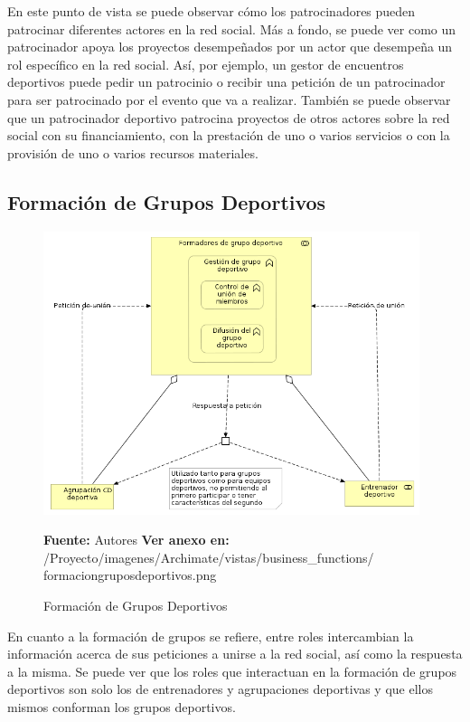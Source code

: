 En este punto de vista se puede observar cómo los patrocinadores pueden patrocinar diferentes actores en la red social. Más a fondo, se puede ver como un patrocinador apoya los proyectos desempeñados por un actor que desempeña un rol específico en la red social. Así, por ejemplo, un gestor de encuentros deportivos puede pedir un patrocinio o recibir una petición de un patrocinador para ser patrocinado por el evento que va a realizar. También se puede observar que un patrocinador deportivo patrocina proyectos de otros actores sobre la red social con su financiamiento, con la prestación de uno o varios servicios o con la provisión de uno o varios recursos materiales.

\subsection{Formación de Grupos Deportivos}

\begin{figure}[!htb]
  \begin{center}
    \includegraphics[width=11cm]{./imagenes/Archimate/vistas/business_functions/formaciongruposdeportivos.png}
    \caption{Formación de Grupos Deportivos}
    \label{fig:bf_formacion_grupos_deportivos}
    \textbf{Fuente:}  Autores
    \textbf{Ver anexo en:} /Proyecto/imagenes/Archimate/vistas/business\_functions/
    formaciongruposdeportivos.png
  \end{center}
\end{figure}

En cuanto a la formación de grupos se refiere, entre roles intercambian la información acerca de sus peticiones a unirse a la red social, así como la respuesta a la misma. Se puede ver que los roles que interactuan en la formación de grupos deportivos son solo los de entrenadores y agrupaciones deportivas y que ellos mismos conforman los grupos deportivos.


